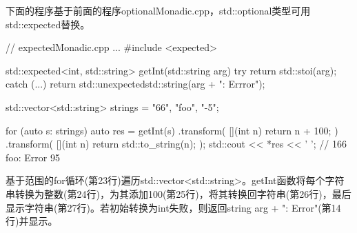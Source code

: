 下面的程序基于前面的程序optionalMonadic.cpp，std::optional类型可用std::expected替换。


\begin{cpp}
// expectedMonadic.cpp
...
#include <expected>

std::expected<int, std::string> getInt(std::string arg) {
	try {
		return std::stoi(arg);
	}
	catch (...) {
		return std::unexpected{std::string(arg + ": Errror")};
	}
}

std::vector<std::string> strings = {"66", "foo", "-5"};

for (auto s: strings) {
	auto res = getInt(s)
				.transform( [](int n) { return n + 100; })
				.transform( [](int n) { return std::to_string(n); });
	std::cout << *res << ' '; // 166 foo: Error 95
}
\end{cpp}

基于范围的for循环(第23行)遍历std::vector<std::string>。getInt函数将每个字符串转换为整数(第24行)，为其添加100(第25行)，将其转换回字符串(第26行)，最后显示字符串(第27行)。若初始转换为int失败，则返回string arg + ": Error"(第14行)并显示。







































